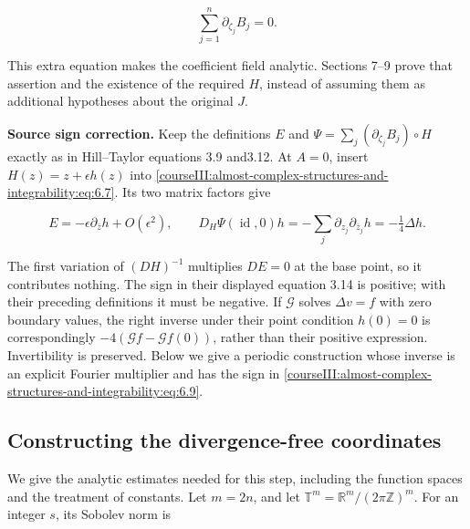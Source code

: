 \begin{equation}
\sum_{j=1}^n\partial_{\zeta_j}B_j=0.
\label{courseIII:almost-complex-structures-and-integrability:eq:6.8}
\end{equation}

This extra equation makes the coefficient field analytic. Sections 7--9 prove that assertion and the existence of the required \(H\), instead of assuming them as additional hypotheses about the original \(J\).

\textbf{Source sign correction.} Keep the definitions \(E\) and \(\Psi=\sum_j(\partial_{\zeta_j}B_j)\circ H\) exactly as in Hill--Taylor equations 3.9 and3.12. At \(A=0\), insert \(H(z)=z+\epsilon h(z)\) into \eqref{courseIII:almost-complex-structures-and-integrability:eq:6.7}. Its two matrix factors give

\begin{equation}
E=-\epsilon\partial_{\bar z}h+O(\epsilon^2),
\qquad
D_H\Psi(\operatorname{id},0)h
=-\sum_j\partial_{z_j}\partial_{\bar z_j}h
=-\tfrac14\Delta h.
\label{courseIII:almost-complex-structures-and-integrability:eq:6.9}
\end{equation}

The first variation of \((DH)^{-1}\) multiplies \(DE=0\) at the base point, so it contributes nothing. The sign in their displayed equation 3.14 is positive; with their preceding definitions it must be negative. If \(\mathcal G\) solves \(\Delta v=f\) with zero boundary values, the right inverse under their point condition \(h(0)=0\) is correspondingly \(-4(\mathcal Gf-\mathcal Gf(0))\), rather than their positive expression. Invertibility is preserved. Below we give a periodic construction whose inverse is an explicit Fourier multiplier and has the sign in \eqref{courseIII:almost-complex-structures-and-integrability:eq:6.9}.

\subsection{Constructing the divergence-free coordinates}
\label{courseIII:almost-complex-structures-and-integrability:periodic-gauge}

\label{courseIII:almost-complex-structures-and-integrability:section-7}

We give the analytic estimates needed for this step, including the function spaces and the treatment of constants. Let \(m=2n\), and let \(\mathbb T^m=\mathbb R^m/(2\pi\mathbb Z)^m\). For an integer \(s\), its Sobolev norm is

